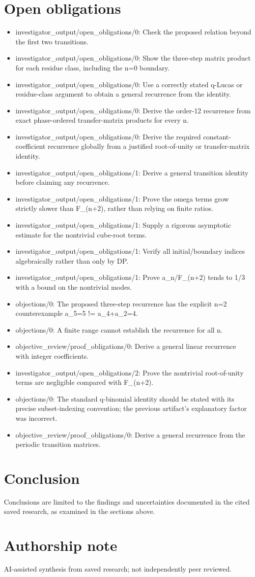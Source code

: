 \documentclass[11pt]{article}
\begin{document}
\section{Open obligations}
\begin{itemize}
\item investigator\_output/open\_obligations/0: Check the proposed relation beyond the first two transitions.
\item investigator\_output/open\_obligations/0: Show the three-step matrix product for each residue class, including the n=0 boundary.
\item investigator\_output/open\_obligations/0: Use a correctly stated q-Lucas or residue-class argument to obtain a general recurrence from the identity.
\item investigator\_output/open\_obligations/0: Derive the order-12 recurrence from exact phase-ordered transfer-matrix products for every n.
\item investigator\_output/open\_obligations/0: Derive the required constant-coefficient recurrence globally from a justified root-of-unity or transfer-matrix identity.
\item investigator\_output/open\_obligations/1: Derive a general transition identity before claiming any recurrence.
\item investigator\_output/open\_obligations/1: Prove the omega terms grow strictly slower than F\_(n+2), rather than relying on finite ratios.
\item investigator\_output/open\_obligations/1: Supply a rigorous asymptotic estimate for the nontrivial cube-root terms.
\item investigator\_output/open\_obligations/1: Verify all initial/boundary indices algebraically rather than only by DP.
\item investigator\_output/open\_obligations/1: Prove a\_n/F\_(n+2) tends to 1/3 with a bound on the nontrivial modes.
\item objections/0: The proposed three-step recurrence has the explicit n=2 counterexample a\_5=5 != a\_4+a\_2=4.
\item objections/0: A finite range cannot establish the recurrence for all n.
\item objective\_review/proof\_obligations/0: Derive a general linear recurrence with integer coefficients.
\item investigator\_output/open\_obligations/2: Prove the nontrivial root-of-unity terms are negligible compared with F\_(n+2).
\item objections/0: The standard q-binomial identity should be stated with its precise subset-indexing convention; the previous artifact's explanatory factor was incorrect.
\item objective\_review/proof\_obligations/0: Derive a general recurrence from the periodic transition matrices.
\end{itemize}
\section{Conclusion}
Conclusions are limited to the findings and uncertainties documented in the cited saved research, as examined in the sections above.

\section*{Authorship note}
AI-assisted synthesis from saved research; not independently peer reviewed.
\end{document}
